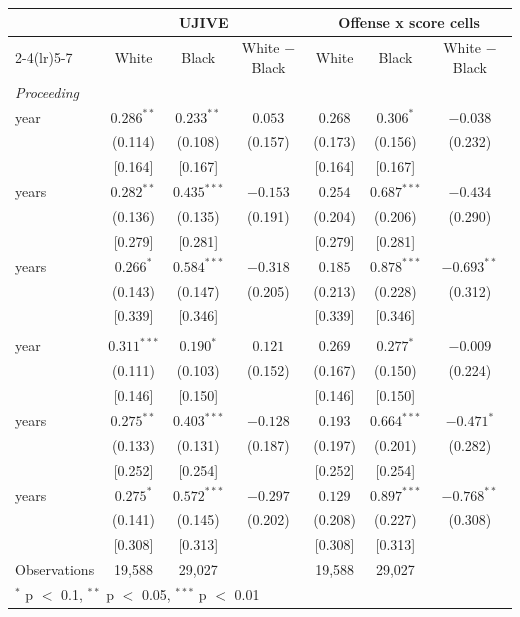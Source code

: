 \begin{tabular}{lcccccc}
\toprule
 & \multicolumn{3}{c}{UJIVE} & \multicolumn{3}{c}{Offense x score cells} \\
\cmidrule(lr){2-4}\cmidrule(lr){5-7}
 & White & Black & White $-$ Black & White & Black & White $-$ Black \\
\midrule
\multicolumn{7}{l}{\textit{Proceeding}} \\
\quad 1 year & $0.286^{**}$ & $0.233^{**}$ & $0.053$ & $0.268$ & $0.306^{*}$ & $-0.038$ \\
 & (0.114) & (0.108) & (0.157) & (0.173) & (0.156) & (0.232) \\
 & [0.164] & [0.167] &  & [0.164] & [0.167] &  \\
\quad 2 years & $0.282^{**}$ & $0.435^{***}$ & $-0.153$ & $0.254$ & $0.687^{***}$ & $-0.434$ \\
 & (0.136) & (0.135) & (0.191) & (0.204) & (0.206) & (0.290) \\
 & [0.279] & [0.281] &  & [0.279] & [0.281] &  \\
\quad 3 years & $0.266^{*}$ & $0.584^{***}$ & $-0.318$ & $0.185$ & $0.878^{***}$ & $-0.693^{**}$ \\
 & (0.143) & (0.147) & (0.205) & (0.213) & (0.228) & (0.312) \\
 & [0.339] & [0.346] &  & [0.339] & [0.346] &  \\
\addlinespace
\multicolumn{7}{l}{\textit{Revoked}} \\
\quad 1 year & $0.311^{***}$ & $0.190^{*}$ & $0.121$ & $0.269$ & $0.277^{*}$ & $-0.009$ \\
 & (0.111) & (0.103) & (0.152) & (0.167) & (0.150) & (0.224) \\
 & [0.146] & [0.150] &  & [0.146] & [0.150] &  \\
\quad 2 years & $0.275^{**}$ & $0.403^{***}$ & $-0.128$ & $0.193$ & $0.664^{***}$ & $-0.471^{*}$ \\
 & (0.133) & (0.131) & (0.187) & (0.197) & (0.201) & (0.282) \\
 & [0.252] & [0.254] &  & [0.252] & [0.254] &  \\
\quad 3 years & $0.275^{*}$ & $0.572^{***}$ & $-0.297$ & $0.129$ & $0.897^{***}$ & $-0.768^{**}$ \\
 & (0.141) & (0.145) & (0.202) & (0.208) & (0.227) & (0.308) \\
 & [0.308] & [0.313] &  & [0.308] & [0.313] &  \\
\midrule
Observations & 19,588 & 29,027 &  & 19,588 & 29,027 &  \\
\bottomrule
\multicolumn{7}{l}{\footnotesize $^{*}$ p $<$ 0.1, $^{**}$ p $<$ 0.05, $^{***}$ p $<$ 0.01} \\
\end{tabular}
